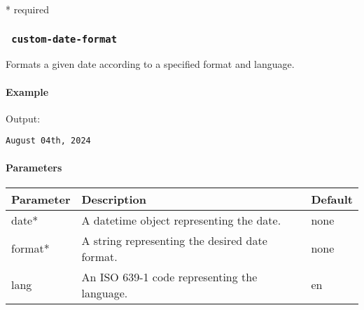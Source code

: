 * required

\subsubsection{\texorpdfstring{\texttt{\ custom-date-format\ }}{ custom-date-format }}\label{custom-date-format}

Formats a given date according to a specified format and language.

\paragraph{Example}\label{example-2}

\begin{Shaded}
\begin{Highlighting}[]

\end{Highlighting}
\end{Shaded}

Output:

\begin{verbatim}
August 04th, 2024
\end{verbatim}

\paragraph{Parameters}\label{parameters-2}

\begin{Shaded}
\begin{Highlighting}[]
\end{Highlighting}
\end{Shaded}

\begin{longtable}[]{@{}lll@{}}
\toprule\noalign{}
Parameter & Description & Default \\
\midrule\noalign{}
\endhead
\bottomrule\noalign{}
\endlastfoot
date* & A datetime object representing the date. & none \\
format* & A string representing the desired date format. & none \\
lang & An ISO 639-1 code representing the language. & en \\
\end{longtable}


